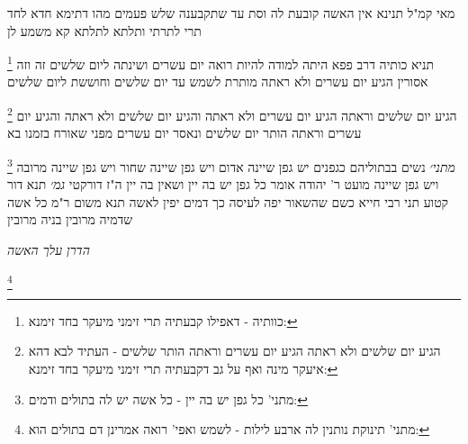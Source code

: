 \documentclass[12pt, openany]{book}
\newcommand{\footnotecomment}[1]{
	\renewcommand\thefootnote{}
	\footnote{#1}}
\newcommand{\commenta}[1]{\footnotecomment{#1}}
\begin{document}
{{מאי קמ"ל תנינא אין האשה קובעת לה וסת עד שתקבענה שלש פעמים מהו דתימא חדא לחד תרי לתרתי ותלתא לתלתא קא משמע לן 
\commenta{כוותיה - דאפילו קבעתיה תרי זימני מיעקר בחד זימנא:}
תניא כותיה דרב פפא היתה למודה להיות רואה יום עשרים ושינתה ליום שלשים זה וזה אסורין הגיע יום עשרים ולא ראתה מותרת לשמש עד יום שלשים וחוששת ליום שלשים 
\commenta{הגיע יום שלשים ולא ראתה הגיע יום עשרים וראתה הותר שלשים - העתיד לבא דהא איעקר מינה ואף על גב דקבעתיה תרי זימני מיעקר בחד זימנא:}
הגיע יום שלשים וראתה הגיע יום עשרים ולא ראתה והגיע יום שלשים ולא ראתה והגיע יום עשרים וראתה הותר יום שלשים
ונאסר יום עשרים מפני שאורח בזמנו בא 
\commenta{מתני' כל גפן יש בה יין - כל אשה יש לה בתולים ודמים:}
{\large\emph{מתני׳}} נשים בבתוליהם כגפנים יש גפן שיינה אדום ויש גפן שיינה שחור ויש גפן שיינה מרובה ויש גפן שיינה מועט ר' יהודה אומר כל גפן יש בה יין ושאין בה יין ה"ז דורקטי
{\large\emph{גמ׳}} תנא דור קטוע תני רבי חייא כשם שהשאור יפה לעיסה כך דמים יפין לאשה תנא משום ר"מ כל אשה שדמיה מרובין בניה מרובין
\par \par {\large\emph{הדרן עלך האשה}}\par \par 
\commenta{מתני' תינוקת נותנין לה ארבע לילות - לשמש ואפי' רואה אמרינן דם בתולים הוא:}

}}
\end{document}
